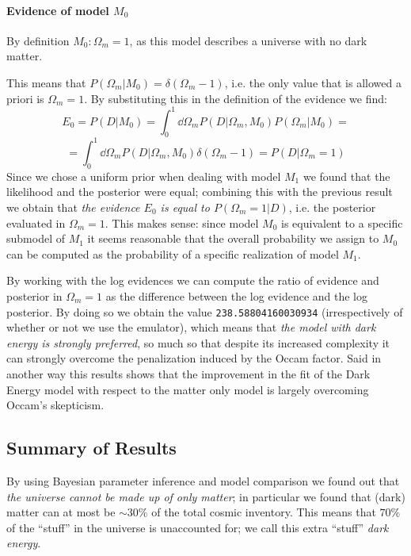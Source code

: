 \paragraph{Evidence of model $M_0$}
By definition $M_0: \Omega_m = 1$, as this model describes a universe with no dark matter. 

This means that $P(\Omega_m|M_0) = \delta(\Omega_m-1)$, i.e. the only value that is allowed a priori is $\Omega_m = 1$.
By substituting this in the definition of the evidence we find:
\begin{equation*}
    E_0 = P(D|M_0) = \int_0^1 \dd{\Omega_m} P(D|\Omega_m, M_0) P(\Omega_m|M_0) = 
\end{equation*}
\begin{equation*}
    = \int_0^1 \dd{\Omega_m} P(D|\Omega_m, M_0) \delta(\Omega_m - 1) = P(D|\Omega_m = 1)
\end{equation*}
Since we chose a uniform prior when dealing with model $M_1$ we found that the likelihood and the posterior were equal; combining this with the previous result we obtain that \emph{the evidence $E_0$ is equal to $P(\Omega_m=1|D)$}, i.e. the posterior evaluated in $\Omega_m = 1$. This makes sense: since model $M_0$ is equivalent to a specific submodel of $M_1$ it seems reasonable that the overall probability we assign to $M_0$ can be computed as the probability of a specific realization of model $M_1$.

By working with the log evidences we can compute the ratio of evidence and posterior in $\Omega_m = 1$ as the difference between the log evidence and the log posterior. By doing so we obtain the value \texttt{238.58804160030934} (irrespectively of whether or not we use the emulator), which means that \emph{the model with dark energy is strongly preferred}, so much so that despite its increased complexity it can strongly overcome the penalization induced by the Occam factor. Said in another way this results shows that the improvement in the fit of the Dark Energy model with respect to the matter only model is largely overcoming Occam's skepticism.

\subsection{Summary of Results}
By using Bayesian parameter inference and model comparison we found out that \emph{the universe cannot be made up of only matter}; in particular we found that (dark) matter can at most be $\sim 30\%$ of the total cosmic inventory. This means that $70\%$ of the ``stuff'' in the universe is unaccounted for; we call this extra ``stuff'' \emph{dark energy}.

